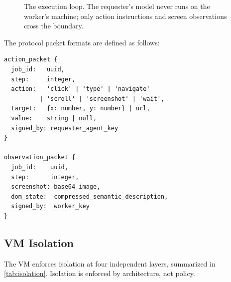 \documentclass[10pt,twocolumn]{article}
\begin{document}
\begin{figure}[H]
\centering
{}
\caption{The execution loop. The requester's model never runs on the worker's machine; only action instructions and screen observations cross the boundary.}
\label{fig:execloop}
\end{figure}

The protocol packet formats are defined as follows:

\begin{lstlisting}[language={},caption={Action and Observation Packet Formats},label={lst:packets}]
action_packet {
  job_id:   uuid,
  step:     integer,
  action:   'click' | 'type' | 'navigate'
          | 'scroll' | 'screenshot' | 'wait',
  target:   {x: number, y: number} | url,
  value:    string | null,
  signed_by: requester_agent_key
}

observation_packet {
  job_id:    uuid,
  step:      integer,
  screenshot: base64_image,
  dom_state:  compressed_semantic_description,
  signed_by:  worker_key
}
\end{lstlisting}

\subsection{VM Isolation}

The VM enforces isolation at four independent layers, summarized in \cref{tab:isolation}. Isolation is enforced by architecture, not policy.
\end{document}
